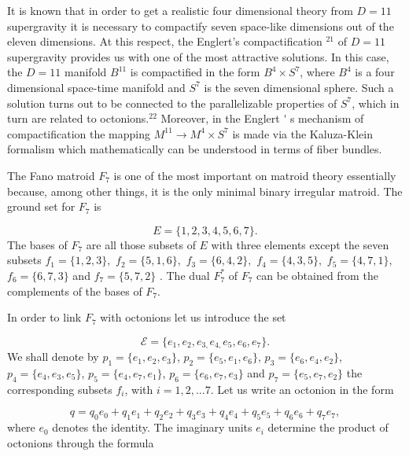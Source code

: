 \documentclass[a4paper,12pt]{article}
\begin{document}
It is known that in order to get a realistic four dimensional theory from $%
D=11$ supergravity it is necessary to compactify seven space-like dimensions
out of the eleven dimensions. At this respect, the Englert's compactification%
$^{21}$ of $D=11$ supergravity provides us with one of the most attractive
solutions. In this case, the $D=11$ manifold $B^{11}$ is compactified in the
form $B^{4}\times S^{7}$, where $B^{4}$ is a four dimensional space-time
manifold and $S^{7}$ is the seven dimensional sphere. Such a solution turns
out to be connected to the parallelizable properties of $S^{7}$, which in
turn are related to octonions.$^{22}$ Moreover, in the Englert%
\'{}%
s mechanism of compactification the mapping $M^{11}\rightarrow M^{4}\times
S^{7}$ is made via the Kaluza-Klein formalism which mathematically can be
understood in terms of fiber bundles.

The Fano matroid $F_{7}$ is one of the most important on matroid theory
essentially because, among other things, it is the only minimal binary
irregular matroid. The ground set for $F_{7}$ is

\begin{equation}
E=\{1,2,3,4,5,6,7\}.  \label{8}
\end{equation}
The bases of $F_{7}$ are all those subsets of $E$ with three elements except
the seven subsets $f_{1}=\{1,2,3\},$ $f_{2}=\{5,1,6\},$ $f_{3}=\{6,4,2\},$ $%
f_{4}=\{4,3,5\},$ $f_{5}=\{4,7,1\},$ $f_{6}=\{6,7,3\}$ and $f_{7}=\{5,7,2\}$%
. The dual $F_{7}^{\ast }$ of $F_{7}$ can be obtained from the complements
of the bases of $F_{7}$.

In order to link $F_{7}$ with octonions let us introduce the set

\begin{equation}
\mathcal{E}=\{e_{1},e_{2},e_{3,}e_{4,}e_{5},e_{6},e_{7}\}.  \label{9}
\end{equation}
We shall denote by $p_{1}=\{e_{1},e_{2},e_{3}\}$, $p_{2}=\{e_{5},e_{1},e_{6}%
\}$, $p_{3}=\{e_{6},e_{4},e_{2}\}$, $p_{4}=\{e_{4},e_{3},e_{5}\}$, $%
p_{5}=\{e_{4},e_{7},e_{1}\}$, $p_{6}=\{e_{6},e_{7},e_{3}\}$ and $%
p_{7}=\{e_{5},e_{7},e_{2}\}$ the corresponding subsets $f_{i}$, with $%
i=1,2,...7$. Let us write an octonion in the form

\begin{equation}
q=q_{0}e_{0}+q_{1}e_{1}+q_{2}e_{2}+q_{3}e_{3}+q_{4}e_{4}+q_{5}e_{5}+q_{6}e_{6}
+q_{7}e_{7},
\label{10}
\end{equation}
where $e_{0}$ denotes the identity. The imaginary units $e_{i}$ determine
the product of octonions through the formula
\end{document}

